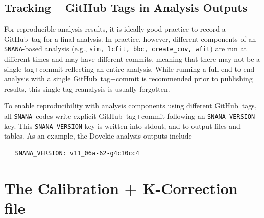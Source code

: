 \documentclass[12pt]{article}
\newcommand{\snana}{{\tt SNANA}}
\begin{document}
{\subsection{Tracking \faGithub ~ GitHub Tags in Analysis Outputs}
\label{subsec:tracking_git_tags}

\newcommand{\git}{GitHub}

For reproducible analysis results,
it is ideally good practice to record a \git\ tag for a final analysis.
In practice, however, different components of an \snana-based analysis 
(e.g., {\tt sim, lcfit, bbc, create\_cov, wfit})
are run at different times and may have different commits, 
meaning that there may not be a single tag+commit reflecting an entire analysis.
While running a full end-to-end analysis with a single \git\ tag+commit
is recommended prior to publishing results, this single-tag 
reanalysis is usually forgotten. 

To enable reproducibility with analysis components using different \git\ tags,
all \snana\ codes write explicit \git\ tag+commit following an \verb|SNANA_VERSION|
key. This \verb|SNANA_VERSION| key is written into stdout, 
and to output files and tables. 
As an example, the Dovekie analysis outputs include
\begin{verbatim}
   SNANA_VERSION: v11_06a-62-g4c10cc4 
\end{verbatim}


   \clearpage
   \section{The Calibration + K-Correction file}
   \label{sec:kcorFile}

}
\end{document}
